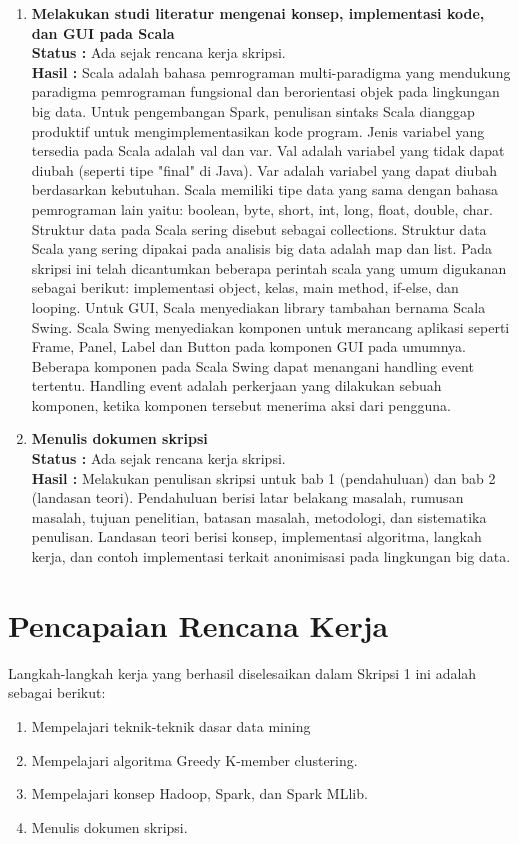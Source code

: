 \documentclass[a4paper,twoside]{article}
\begin{document}
\begin{enumerate}
\item \textbf{Melakukan studi literatur mengenai konsep, implementasi kode, dan GUI pada Scala}\\
		{\bf Status :} Ada sejak rencana kerja skripsi.\\
		{\bf Hasil :} Scala adalah bahasa pemrograman multi-paradigma yang mendukung paradigma pemrograman fungsional dan berorientasi objek pada lingkungan big data. Untuk pengembangan Spark, penulisan sintaks Scala dianggap produktif untuk mengimplementasikan kode program. Jenis variabel yang tersedia pada Scala adalah val dan var. Val adalah variabel yang tidak dapat diubah (seperti tipe "final" di Java). Var adalah variabel yang dapat diubah berdasarkan kebutuhan. Scala memiliki tipe data yang sama dengan bahasa pemrograman lain yaitu: boolean, byte, short, int, long, float, double, char. Struktur data pada Scala sering disebut sebagai collections. Struktur data Scala yang sering dipakai pada analisis big data adalah map dan list. Pada skripsi ini telah dicantumkan beberapa perintah scala yang umum digukanan sebagai berikut: implementasi object, kelas, main method, if-else, dan looping. Untuk GUI, Scala menyediakan library tambahan bernama Scala Swing. Scala Swing menyediakan komponen untuk merancang aplikasi seperti Frame, Panel, Label dan Button pada komponen GUI pada umumnya. Beberapa komponen pada Scala Swing dapat menangani handling event tertentu. Handling event adalah perkerjaan yang dilakukan sebuah komponen, ketika komponen tersebut menerima aksi dari pengguna.

		\item \textbf{Menulis dokumen skripsi}\\
		{\bf Status :} Ada sejak rencana kerja skripsi.\\
		{\bf Hasil :} Melakukan penulisan skripsi untuk bab 1 (pendahuluan) dan bab 2 (landasan teori). Pendahuluan berisi latar belakang masalah, rumusan masalah, tujuan penelitian, batasan masalah, metodologi, dan sistematika penulisan. Landasan teori berisi konsep, implementasi algoritma, langkah kerja, dan contoh implementasi terkait anonimisasi pada lingkungan big data.

	\end{enumerate}

\section{Pencapaian Rencana Kerja}
Langkah-langkah kerja yang berhasil diselesaikan dalam Skripsi 1 ini adalah sebagai berikut:
\begin{enumerate}
\item Mempelajari teknik-teknik dasar data mining
\item Mempelajari algoritma Greedy K-member clustering.
\item Mempelajari konsep Hadoop, Spark, dan Spark MLlib.
\item Menulis dokumen skripsi.
\end{enumerate}
\end{document}
